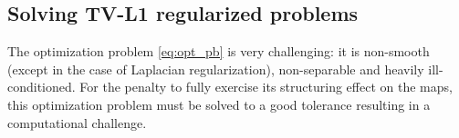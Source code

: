 
\subsection{Solving TV-L1 regularized problems}
The optimization problem \eqref{eq:opt_pb} is very challenging:
it is non-smooth (except in the case of Laplacian regularization), non-separable and heavily ill-conditioned. For the penalty to fully exercise its
structuring effect on the maps, this optimization problem must be
solved to a good tolerance resulting in a computational challenge.

